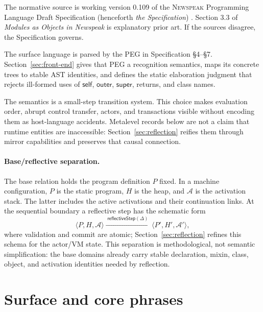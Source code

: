 \documentclass[11pt]{article}
\numberwithin{equation}{section}
\newcommand{\NS}{\textsc{Newspeak}}
\newcommand{\kw}[1]{\ensuremath{\mathsf{#1}}}
\begin{document}
The normative source is working version 0.109 of the \NS{} Programming
Language Draft Specification (henceforth \emph{the Specification})
\cite{newspeak-spec-0.109}.
Section 3.3 of \emph{Modules as Objects in Newspeak} \cite{bracha10a} is
explanatory prior art.  If the sources disagree, the Specification governs.

The surface language is parsed by the PEG in Specification \S4--\S7.
Section~\ref{sec:front-end} gives that PEG a recognition semantics, maps its
concrete trees to stable AST identities, and defines the static elaboration
judgment that rejects ill-formed uses of \kw{self}, \kw{outer}, \kw{super},
returns, and class names.

The semantics is a small-step transition system.  This choice makes evaluation
order, abrupt control transfer, actors, and transactions visible without
encoding them as host-language accidents.  Metalevel records below are not a
claim that runtime entities are inaccessible: Section~\ref{sec:reflection}
reifies them through mirror capabilities and preserves that causal connection.

\paragraph{Base/reflective separation.}
The base relation holds the program definition $P$ fixed.  In a machine
configuration, $P$ is the static program, $H$ is the heap, and $\mathcal A$ is
the activation stack.  The latter includes the active activations and their
continuation links.  At the sequential boundary a reflective step has the
schematic form
\begin{equation}\label{eq:reflective-step}
  \langle P,H,\mathcal A\rangle
    \xrightarrow{\;\mathsf{reflectiveStep}(\Delta)\;}
  \langle P',H',\mathcal A'\rangle,
\end{equation}
where validation and commit are atomic; Section~\ref{sec:reflection} refines
this schema for the actor/VM state.  This separation is methodological,
not semantic simplification: the base domains already carry stable declaration,
mixin, class, object, and activation identities needed by reflection.

\section{Surface and core phrases}
\label{sec:surface}
\end{document}
